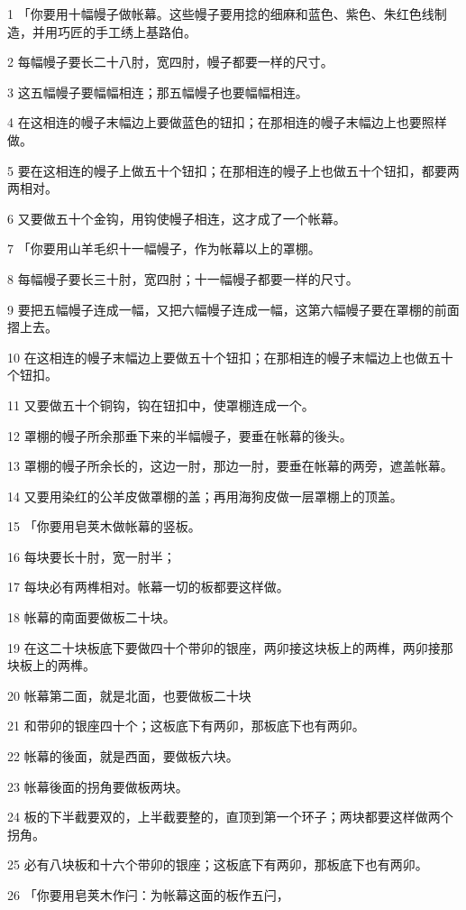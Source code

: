 \par 1 「你要用十幅幔子做帐幕。这些幔子要用捻的细麻和蓝色、紫色、朱红色线制造，并用巧匠的手工绣上基路伯。
\par 2 每幅幔子要长二十八肘，宽四肘，幔子都要一样的尺寸。
\par 3 这五幅幔子要幅幅相连；那五幅幔子也要幅幅相连。
\par 4 在这相连的幔子末幅边上要做蓝色的钮扣；在那相连的幔子末幅边上也要照样做。
\par 5 要在这相连的幔子上做五十个钮扣；在那相连的幔子上也做五十个钮扣，都要两两相对。
\par 6 又要做五十个金钩，用钩使幔子相连，这才成了一个帐幕。
\par 7 「你要用山羊毛织十一幅幔子，作为帐幕以上的罩棚。
\par 8 每幅幔子要长三十肘，宽四肘；十一幅幔子都要一样的尺寸。
\par 9 要把五幅幔子连成一幅，又把六幅幔子连成一幅，这第六幅幔子要在罩棚的前面摺上去。
\par 10 在这相连的幔子末幅边上要做五十个钮扣；在那相连的幔子末幅边上也做五十个钮扣。
\par 11 又要做五十个铜钩，钩在钮扣中，使罩棚连成一个。
\par 12 罩棚的幔子所余那垂下来的半幅幔子，要垂在帐幕的後头。
\par 13 罩棚的幔子所余长的，这边一肘，那边一肘，要垂在帐幕的两旁，遮盖帐幕。
\par 14 又要用染红的公羊皮做罩棚的盖；再用海狗皮做一层罩棚上的顶盖。
\par 15 「你要用皂荚木做帐幕的竖板。
\par 16 每块要长十肘，宽一肘半；
\par 17 每块必有两榫相对。帐幕一切的板都要这样做。
\par 18 帐幕的南面要做板二十块。
\par 19 在这二十块板底下要做四十个带卯的银座，两卯接这块板上的两榫，两卯接那块板上的两榫。
\par 20 帐幕第二面，就是北面，也要做板二十块
\par 21 和带卯的银座四十个；这板底下有两卯，那板底下也有两卯。
\par 22 帐幕的後面，就是西面，要做板六块。
\par 23 帐幕後面的拐角要做板两块。
\par 24 板的下半截要双的，上半截要整的，直顶到第一个环子；两块都要这样做两个拐角。
\par 25 必有八块板和十六个带卯的银座；这板底下有两卯，那板底下也有两卯。
\par 26 「你要用皂荚木作闩：为帐幕这面的板作五闩，
